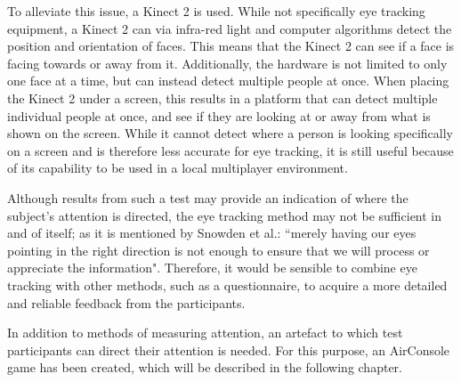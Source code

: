 To alleviate this issue, a Kinect 2 is used. While not specifically eye tracking equipment, a Kinect 2 can via infra-red light and computer algorithms detect the position and orientation of faces. This means that the Kinect 2 can see if a face is facing towards or away from it. Additionally, the hardware is not limited to only one face at a time, but can instead detect multiple people at once. When placing the Kinect 2 under a screen, this results in a platform that can detect multiple individual people at once, and see if they are looking at or away from what is shown on the screen. While it cannot detect where a person is looking specifically on a screen and is therefore less accurate for eye tracking, it is still useful because of its capability to be used in a local multiplayer environment.

Although results from such a test may provide an indication of where the subject’s attention is directed, the eye tracking method may not be sufficient in and of itself; as it is mentioned by Snowden et al.\cite{snowden2012basic}: “merely having our eyes pointing in the right direction is not enough to ensure that we will process or appreciate the information". Therefore, it would be sensible to combine eye tracking with other methods, such as a questionnaire, to acquire a more detailed and reliable feedback from the participants.

In addition to methods of measuring attention, an artefact to which test participants can direct their attention is needed. For this purpose, an AirConsole game has been created, which will be described in the following chapter.